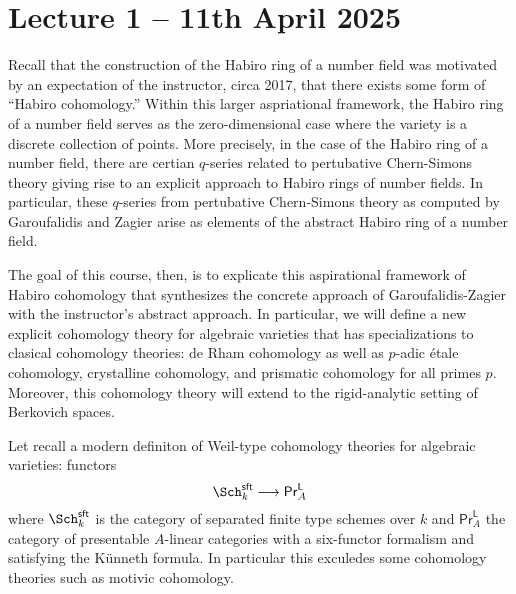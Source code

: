 \section{Lecture 1 -- 11th April 2025}\label{sec: lecture 1}
Recall that the construction of the Habiro ring of a number field \cite{HabiroNumberField,HabiroCourse} was motivated by an expectation of the instructor, circa 2017, that there exists some form of ``Habiro cohomology.'' Within this larger aspriational framework, the Habiro ring of a number field serves as the zero-dimensional case where the variety is a discrete collection of points. More precisely, in the case of the Habiro ring of a number field, there are certian $q$-series related to pertubative Chern-Simons theory giving rise to an explicit approach to Habiro rings of number fields. In particular, these $q$-series from pertubative Chern-Simons theory as computed by Garoufalidis and Zagier arise as elements of the abstract Habiro ring of a number field. 

The goal of this course, then, is to explicate this aspirational framework of Habiro cohomology that synthesizes the concrete approach of Garoufalidis-Zagier with the instructor's abstract approach. In particular, we will define a new explicit cohomology theory for algebraic varieties that has specializations to clasical cohomology theories: de Rham cohomology as well as $p$-adic \'{e}tale cohomology, crystalline cohomology, and prismatic cohomology for all primes $p$. Moreover, this cohomology theory will extend to the rigid-analytic setting of Berkovich spaces. 

Let recall a modern definiton of Weil-type cohomology theories for algebraic varieties: functors 
$$\Sch^{\mathsf{sft}}_{k}\longrightarrow \mathsf{Pr}^{\mathsf{L}}_{A}$$
where $\Sch^{\mathsf{sft}}_{k}$ is the category of separated finite type schemes over $k$ and $ \mathsf{Pr}^{\mathsf{L}}_{A}$ the category of presentable $A$-linear categories with a six-functor formalism and satisfying the K\"{u}nneth formula. In particular this exculedes some cohomology theories such as motivic cohomology. 

